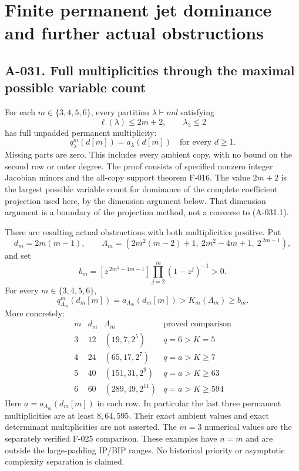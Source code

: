 \section{Finite permanent jet dominance and further actual obstructions}

\subsection*{A-031. Full multiplicities through the maximal possible variable count}
For each \(m\in\{3,4,5,6\}\), every partition
\(\lambda\vdash md\) satisfying
\[
                  \ell(\lambda)\leq2m+2,\qquad\lambda_3\leq2
\]
has full unpadded permanent multiplicity:
\[
                       q^m_\lambda(d[m])=a_\lambda(d[m])
                       \quad\text{for every }d\geq1.           \tag{A-031.1}
\]
Missing parts are zero. This includes every ambient copy, with no
bound on the second row or outer degree. The proof consists of
specified nonzero integer Jacobian minors and the all-copy support
theorem F-016. The value \(2m+2\) is the largest possible variable
count for dominance of the complete coefficient projection used here,
by the dimension argument below. That dimension argument is a
boundary of the projection method, not a converse to (A-031.1).

There are resulting actual obstructions with both multiplicities
positive. Put
\[
 d_m=2m(m-1),\qquad
 \Lambda_m=(2m^2(m-2)+1,\ 2m^2-4m+1,\ 2^{\,2m-1}),              \tag{A-031.2}
\]
and set
\[
 b_m=[z^{\,2m^2-4m-1}]\prod_{j=2}^m(1-z^j)^{-1}>0.
\]
For every \(m\in\{3,4,5,6\}\),
\[
 q^m_{\Lambda_m}(d_m[m])=a_{\Lambda_m}(d_m[m])
                    >K_m(\Lambda_m)\geq b_m.                   \tag{A-031.3}
\]
More concretely:
\[
\begin{array}{c|c|c|c}
 m&d_m&\Lambda_m&\text{proved comparison}\\ \hline
 3&12&(19,7,2^5)&q=6>K=5\\
 4&24&(65,17,2^7)&q=a>K\geq7\\
 5&40&(151,31,2^9)&q=a>K\geq63\\
 6&60&(289,49,2^{11})&q=a>K\geq594
\end{array}                                                   \tag{A-031.4}
\]
Here \(a=a_{\Lambda_m}(d_m[m])\) in each row. In particular the
last three permanent multiplicities are at least \(8,64,595\).
Their exact ambient values and exact determinant multiplicities
are not asserted. The \(m=3\) numerical values are the separately
verified F-025 comparison. These examples have \(n=m\) and are
outside the large-padding IP/BIP ranges. No historical priority
or asymptotic complexity separation is claimed.

